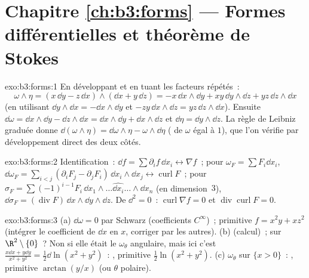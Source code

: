 \section*{Chapitre \ref{ch:b3:forms} --- Formes différentielles et
théorème de Stokes}

\begin{solution}{exo:b3:forms:1}
En développant et en tuant les facteurs répétés~:
\[
\omega\wedge\eta = (x\,\dd y - z\,\dd x)\wedge(\dd x +
y\,\dd z)
= -x\,\dd x\wedge\dd y + xy\,\dd y\wedge\dd z +
yz\,\dd z\wedge\dd x
\]
(en utilisant $\dd y\wedge\dd x = -\dd x\wedge\dd y$ et
$-zy\,\dd x\wedge\dd z = yz\,\dd z\wedge\dd x$). Ensuite
$\dd\omega = \dd x\wedge\dd y - \dd z\wedge\dd x =
\dd x\wedge\dd y + \dd x\wedge\dd z$ et $\dd\eta =
\dd y\wedge\dd z$. La règle de Leibniz graduée donne
$\dd(\omega\wedge\eta) = \dd\omega\wedge\eta -
\omega\wedge\dd\eta$ ( de $\omega$ égal à $1$), que l'on
vérifie par développement direct des deux côtés.
\end{solution}

\begin{solution}{exo:b3:forms:2}
Identification~: $\dd f = \sum\partial_if\,\dd x_i
\leftrightarrow \nabla f$~; pour $\omega_F = \sum F_i\dd
x_i$, $\dd\omega_F = \sum_{i<j}(\partial_iF_j -
\partial_jF_i)\,\dd x_i\wedge\dd x_j \leftrightarrow
\operatorname{curl}F$~; pour $\sigma_F =
\sum(-1)^{i-1}F_i\,\dd x_1\wedge\dots\widehat{\dd
x_i}\dots\wedge\dd x_n$ (en dimension~$3$), $\dd\sigma_F =
(\operatorname{div}F)\,\dd x\wedge\dd y\wedge\dd z$. De
$\dd^2 = 0$~: $\operatorname{curl}\nabla f = 0$ et
$\operatorname{div}\operatorname{curl}F = 0$.
\end{solution}

\begin{solution}{exo:b3:forms:3}
(a) $\dd\omega = 0$ par Schwarz (coefficients $C^\infty$)~;
primitive $f = x^2y + xz^2$ (intégrer le coefficient de
$\dd x$ en $x$, corriger par les autres). (b) 
(calcul)~;  sur $\R^2\setminus\{0\}$~? Non si elle
était le $\omega_\theta$ angulaire, mais ici c'est
$\frac{x\dd x + y\dd y}{x^2+y^2} = \frac12\dd\ln(x^2+y^2)$~:
, primitive $\frac12\ln(x^2+y^2)$. (c) $\omega_\theta$
sur $\{x > 0\}$~: , primitive $\arctan(y/x)$ (ou
$\theta$ polaire).
\end{solution}

